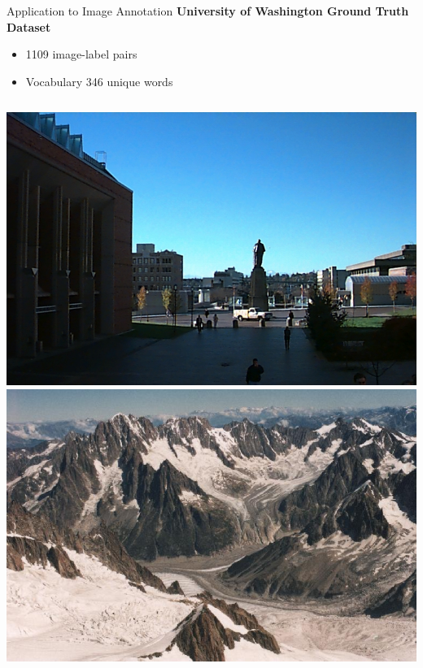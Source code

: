 \documentclass[8pt]{beamer}
\begin{document}
\begin{frame}{Application to Image Annotation}
 \textbf{University of Washington Ground Truth Dataset}
  \begin{itemize}
  \item 1109 image-label pairs
  \item Vocabulary 346 unique words
  \end{itemize}

  \vspace{2ex}

  \begin{columns}[T]

    \begin{column}{0.32\textwidth}
      \includegraphics[width=1.1\textwidth]{figures/img_137.jpg}
      \vspace{2ex}
      \includegraphics[width=1.1\textwidth]{figures/img_1049.jpg}      
    \end{column}%


\end{columns}
\end{frame}
\end{document}
